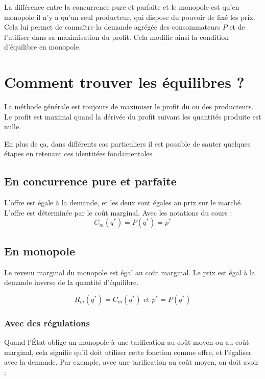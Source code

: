 \documentclass[
]{book}
\theoremstyle{definition}
\theoremstyle{definition}
\theoremstyle{definition}
\theoremstyle{definition}
\theoremstyle{remark}
\begin{document}
La différence entre la concurrence pure et parfaite et le monopole est qu'en monopole il n'y a qu'un seul producteur, qui dispose du pouvoir de fixé les prix.
Cela lui permet de connaître la demande agrégée des consommateurs \(P\) et de l'utiliser dans sa maximisation du profit.
Cela modifie ainsi la condition d'équilibre en monopole.

\hypertarget{comment-trouver-les-uxe9quilibres}{%
\chapter{Comment trouver les équilibres ?}\label{comment-trouver-les-uxe9quilibres}}

La méthode générale est toujours de maximiser le profit du ou des producteurs.
Le profit est maximal quand la dérivée du profit suivant les quantités produite est nulle.

En plus de ça, dans différents cas particuliers il est possible de sauter quelques étapes en retenant ces identitées fondamentales

\hypertarget{en-concurrence-pure-et-parfaite}{%
\section{En concurrence pure et parfaite}\label{en-concurrence-pure-et-parfaite}}

L'offre est égale à la demande, et les deux sont égales au prix sur le marché.
L'offre est déterminée par le coût marginal.
Avec les notations du cours :
\[C_m(q^*)=P(q^*)=p^*\]

\hypertarget{en-monopole}{%
\section{En monopole}\label{en-monopole}}

Le revenu marginal du monopole est égal au coût marginal.
Le prix est égal à la demande inverse de la quantité d'équilibre.

\[R_m(q^*)=C_m(q^*)\text{ et }p^*=P(q^*)\]

\hypertarget{avec-des-ruxe9gulations}{%
\subsection{Avec des régulations}\label{avec-des-ruxe9gulations}}

Quand l'État oblige un monopole à une tarification au coût moyen ou au coût marginal, cela signifie qu'il doit utiliser cette fonction comme offre, et l'égaliser avec la demande.
Par exemple, avec une tarification au coût moyen, on doit avoir :
\end{document}
